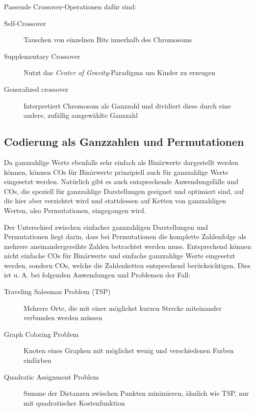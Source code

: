 	Passende Crossover-Operationen dafür sind:
	\begin{description}
		\item[Self-Crossover] Tauschen von einzelnen Bits innerhalb des Chromosoms\cite{SelfCrossover}
		\item[Supplementary Crossover] Nutzt das \textit{Center of Gravity}-Paradigma um Kin\-der zu erzeugen\cite{SupplementaryCrossover}
		\item[Generalized crossover] Interpretiert Chromosom als Ganzzahl und dividiert diese durch eine andere, zufällig ausgewählte Ganzzahl\cite{GeneralizedCrossover}
	\end{description}

\subsection{Codierung als Ganzzahlen und Permutationen}
\label{sec:IntCod}

	Da ganzzahlige Werte ebenfalls sehr einfach als Binärwerte dargestellt werden können, können COs für Binärwerte prinzipiell auch für ganzzahlige Werte eingesetzt werden. Natürlich gibt es auch entsprechende Anwendungsfälle und COs, die speziell für ganzzahlige Darstellungen geeignet und optimiert sind, auf die hier aber verzichtet wird und stattdessen auf Ketten von ganzzahligen Werten, also Permutationen, eingegangen wird.
	
	Der Unterschied zwischen einfacher ganzzahligen Darstellungen und Permutationen liegt darin, dass bei Permutationen die komplette Zahlenfolge als mehrere aneinandergereihte Zahlen betrachtet werden muss. Entsprechend kön\-nen nicht einfache COs für Binärwerte und einfache ganzzahlige Werte eingesetzt werden, sondern COs, welche die Zahlenketten entsprechend berücksichtigen. Dies ist u. A. bei folgenden Anwendungen und Problemen der Fall:
	\begin{description}
		\item[Traveling Salesman Problem (TSP)] Mehrere Orte, die mit einer möglichst kurzen Strecke miteinander verbunden werden müssen\cite{GAforTSP}
		\item[Graph Coloring Problem] Knoten eines Graphen mit möglichst wenig und verschiedenen Farben einfärben\cite{OrderBasedForGCP}
		\item[Quadratic Assignment Problem] Summe der Distanzen zwischen Punkten minimieren, ähnlich wie TSP, nur mit quadratischer Kostenfunktion\cite{COforQAP}
	\end{description}
	
